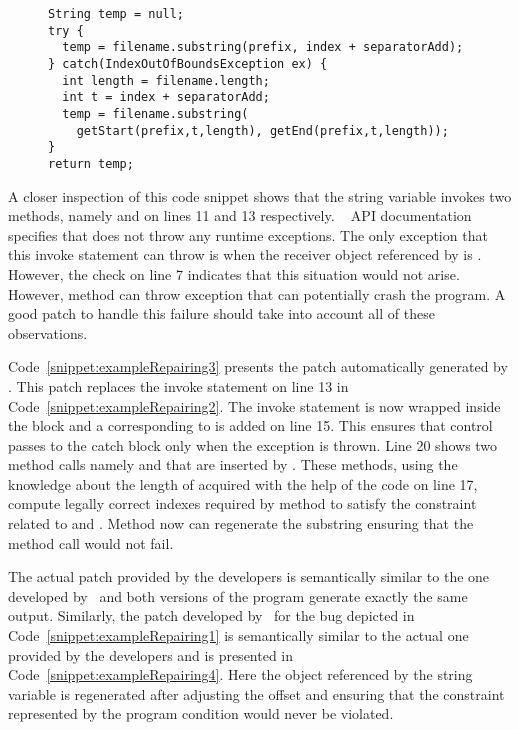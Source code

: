 \begin{figure}[t]
\centering
\begin{lstlisting}
String temp = null;
try {
  temp = filename.substring(prefix, index + separatorAdd);
} catch(IndexOutOfBoundsException ex) {
  int length = filename.length;
  int t = index + separatorAdd;
  temp = filename.substring(
    getStart(prefix,t,length), getEnd(prefix,t,length));
}
return temp;
\end{lstlisting}
\end{figure}

A closer inspection of this code snippet shows that the string variable
 invokes two methods, namely  and 
on lines 11 and 13 respectively. \java\  API documentation
specifies that  does not throw any runtime exceptions. The only
exception that this invoke statement can throw is when the receiver object
referenced by  is . However, the check on line 7
indicates that this situation would not arise. However, method 
can throw  exception that can potentially crash
the program. A good patch to handle this failure should take into account all of
these observations. 

Code~\ref{snippet:exampleRepairing3} presents the patch automatically generated
by \tool . This patch replaces the invoke statement on line 13 in
Code~\ref{snippet:exampleRepairing2}. The invoke statement is now wrapped inside
the  block and a  corresponding to
 is added on line 15. This ensures that
control passes to the catch block only when the exception is thrown. Line 20
shows two method calls namely  and  that are
inserted by \tool. These methods, using the knowledge about the length of
 acquired with the help of the code on line 17, compute legally
correct indexes required by  method to satisfy the constraint
related to  and . Method  now
can regenerate the substring ensuring that the method call would not fail. 

The actual patch provided by the developers is semantically similar to the one
developed by \tool\ and both versions of the program generate exactly the same
output. Similarly, the patch developed by \tool\ for the bug depicted in
Code~\ref{snippet:exampleRepairing1} is semantically similar to the actual one
provided by the developers and is presented in
Code~\ref{snippet:exampleRepairing4}. Here the object referenced by the string
variable  is regenerated after adjusting the offset and ensuring that
the constraint represented by the program condition 
would never be violated.


